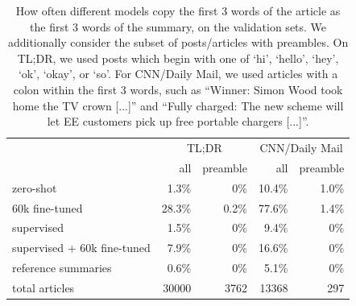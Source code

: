\begin{table}[t]
\centering
\begin{tabular}{l|rr|rr} \toprule
  & \multicolumn{2}{c|}{TL;DR} & \multicolumn{2}{c}{CNN/Daily Mail} \\ 
  & all & preamble & all & preamble \\ 
  \midrule
 

zero-shot &
1.3\% & 0\% &
10.4\% & 1.0\% \\

60k fine-tuned &
28.3\% & 0.2\% &
77.6\% & 1.4\% \\

supervised &
1.5\% & 0\% &
9.4\% & 0\% \\


supervised + 60k fine-tuned &
7.9\% & 0\% &
16.6\% & 0\% \\

reference summaries &
0.6\% & 0\% &
5.1\% & 0\% \\

\midrule
total articles & 
30000 & 3762 &  
13368 & 297 \\

\bottomrule
\end{tabular}
\caption{How often different models copy the first 3 words of the article as the first 3 words of the summary, on the validation sets.  We additionally consider the subset of posts/articles with preambles.
On TL;DR, we used posts which begin with one of `hi', `hello', `hey', `ok', `okay', or `so'.  For CNN/Daily Mail, we used articles with a colon within the first 3 words, such as ``Winner: Simon Wood took home the TV crown [...]'' and ``Fully charged: The new scheme will let EE customers pick up free portable chargers [...]''.  \label{tab:copy-beginning-stats}}
\end{table}
